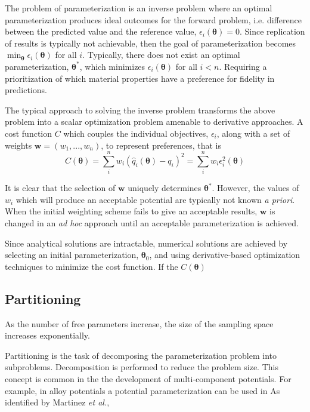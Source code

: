 The problem of parameterization is an inverse problem where an optimal parameterization produces ideal outcomes for the forward problem, i.e. difference between the predicted value and the reference value,
$\epsilon_i(\bm{\theta}) = 0$.
Since replication of results is typically not achievable, then the goal of parameterization becomes
$\min_{\bm{\theta}} \epsilon_i(\bm{\theta})$
for all $i$.  Typically, there does not exist an optimal parameterization, $\bm{\theta}^*$, which minimizes $\epsilon_i(\bm{\theta})$ for all $i < n$.  Requiring a prioritization of which material properties have a preference for fidelity in predictions.

The typical approach to solving the inverse problem transforms the above problem into a scalar optimization problem amenable to derivative approaches.  A cost function $C$ which couples the individual objectives, $\epsilon_i$, along with a set of weights $\bm{w} = (w_1,...,w_n)$, to represent preferences, that is
\begin{equation}
    C(\bm{\theta}) = \sum_i^n w_i (\hat{q}_i(\bm{\theta}) - q_i)^2
                   = \sum_i^n w_i \epsilon_i^2(\bm{\theta})
\end{equation}

It is clear that the selection of $\bm{w}$ uniquely determines $\bm{\theta}^*$.  However, the values of $w_i$ which will produce an acceptable potential are typically not known \emph{a priori}.  When the initial weighting scheme fails to give an acceptable results, $\bm{w}$ is changed in an \emph{ad hoc} approach until an acceptable parameterization is achieved.

Since analytical solutions are intractable, numerical solutions are achieved by selecting an initial parameterization, $\bm{\theta}_0$, and using derivative-based optimization techniques to minimize the cost function.  If the $C(\bm{\theta})$

\subsection{Partitioning}

As the number of free parameters increase, the size of the sampling space increases exponentially.

Partitioning is the task of decomposing the parameterization problem into subproblems.  Decomposition is performed to reduce the problem size.  This concept is common in the the development of multi-component potentials.   For example, in alloy potentials a potential parameterization can be used in  As identified by Martinez \emph{et al.},

